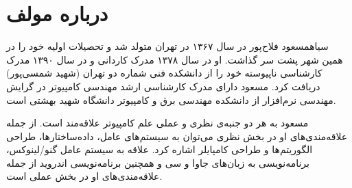 \section*{درباره مولف}
‌سیاه{مسعود فلاح‌پور} در سال ۱۳۶۷ در تهران متولد شد و تحصیلات اولیه خود را در همین شهر پشت سر گذاشت. او در سال ۱۳۷۸ مدرک کاردانی و در سال ۱۳۹۰ مدرک کارشناسی ناپیوسته خود را از دانشکده فنی شماره دو تهران (شهید شمسی‌پور) دریافت کرد. مسعود دارای مدرک کارشناسی ارشد مهندسی کامپیوتر در گرایش مهندسی نرم‌افزار از دانشکده مهندسی برق و کامپیوتر دانشگاه شهید بهشتی است.

مسعود به هر دو جنبه‌ی نظری و عملی علم کامپیوتر علاقه‌مند است. از جمله علاقه‌مندی‌های او در بخش نظری می‌توان به سیستم‌های عامل، داده‌ساختارها، طراحی الگوریتم‌ها و طراحی کامپایلر اشاره کرد. علاقه به سیستم‌ عامل گنو/لینوکس، برنامه‌نویسی به زبان‌های جاوا و سی و همچنین برنامه‌نویسی اندروید از جمله علاقه‌مندی‌های او در بخش عملی است.
\newpage